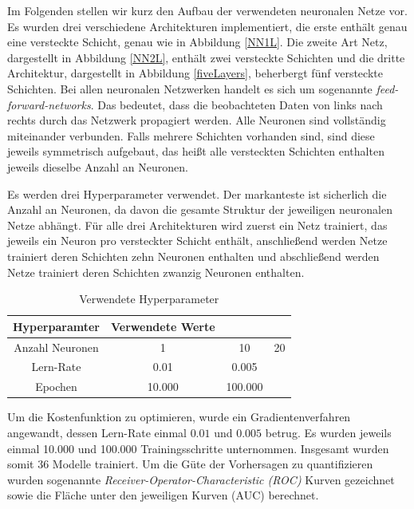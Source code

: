 \documentclass{article}
\begin{document}
Im Folgenden stellen wir kurz den Aufbau der verwendeten neuronalen Netze vor. Es wurden drei verschiedene Architekturen implementiert, die erste enth{\"a}lt genau eine versteckte Schicht, genau wie in Abbildung \ref{NN1L}. Die zweite Art Netz, dargestellt in Abbildung \ref{NN2L}, enth{\"a}lt zwei versteckte Schichten und die dritte Architektur, dargestellt in Abbildung \ref{fiveLayers}, beherbergt f{\"u}nf versteckte Schichten. Bei allen neuronalen Netzwerken handelt es sich um sogenannte \textit{feed-forward-networks}. Das bedeutet, dass die beobachteten Daten von links nach rechts durch das Netzwerk propagiert werden. Alle Neuronen sind vollst{\"a}ndig miteinander verbunden. Falls mehrere Schichten vorhanden sind, sind diese jeweils symmetrisch aufgebaut, das hei{\ss}t alle versteckten Schichten enthalten jeweils dieselbe Anzahl an Neuronen.

Es werden drei Hyperparameter verwendet. Der markanteste ist sicherlich die Anzahl an Neuronen, da davon die gesamte Struktur der jeweiligen neuronalen Netze abh{\"a}ngt. F{\"u}r alle drei Architekturen wird zuerst ein Netz trainiert, das jeweils ein Neuron pro versteckter Schicht enth{\"a}lt, anschlie{\ss}end werden Netze trainiert deren Schichten zehn Neuronen enthalten und abschlie{\ss}end werden Netze trainiert deren Schichten zwanzig Neuronen enthalten.

\begin{table}
\begin{center}
\centering
\caption{Verwendete Hyperparameter}
\vspace{1mm}
\begin{tabular}{cccc}
\hline\hline
Hyperparamter & Verwendete Werte & \\
\hline
Anzahl Neuronen & 1 & 10 & 20 \\
Lern-Rate       & 0.01 & 0.005 & \\
Epochen & 10.000 & 100.000 & \\
\hline
\end{tabular}
\end{center}
\end{table}

Um die Kostenfunktion zu optimieren, wurde ein Gradientenverfahren angewandt, dessen Lern-Rate einmal $0.01$ und $0.005$ betrug. Es wurden jeweils einmal 10.000 und 100.000 Trainingsschritte unternommen. Insgesamt wurden somit 36 Modelle trainiert. Um die G{\"u}te der Vorhersagen zu quantifizieren wurden sogenannte \textit{Receiver-Operator-Characteristic (ROC)} Kurven gezeichnet sowie die Fl{\"a}che unter den jeweiligen Kurven (AUC) berechnet.
\end{document}
